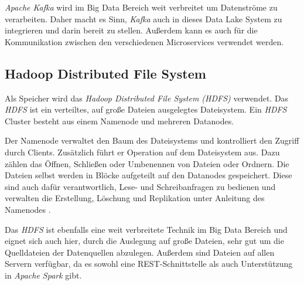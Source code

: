 \textit{Apache Kafka} wird im Big Data Bereich weit verbreitet um Datenströme zu verarbeiten.
Daher macht es Sinn, \textit{Kafka} auch in dieses Data Lake System zu integrieren und darin bereit zu stellen.
Außerdem kann es auch für die Kommunikation zwischen den verschiedenen Microservices verwendet werden.

\subsection{Hadoop Distributed File System}

Als Speicher wird das \textit{Hadoop Distributed File System (HDFS)} verwendet.
Das \textit{HDFS} ist ein verteiltes, auf große Dateien ausgelegtes Dateisystem.
Ein \textit{HDFS} Cluster besteht aus einem Namenode und mehreren Datanodes.

Der Namenode verwaltet den Baum des Dateisystems und kontrolliert den Zugriff durch Clients.
Zusätzlich führt er Operation auf dem Dateisystem aus.
Dazu zählen das Öffnen, Schließen oder Umbenennen von Dateien oder Ordnern.
Die Dateien selbst werden in Blöcke aufgeteilt auf den Datanodes gespeichert.
Diese sind auch dafür verantwortlich, Lese- und Schreibanfragen zu bedienen und verwalten die Erstellung, Löschung und Replikation unter Anleitung des Namenodes \parencite{hdfs}.

Das \textit{HDFS} ist ebenfalls eine weit verbreitete Technik im Big Data Bereich und eignet sich auch hier, durch die Auslegung auf große Dateien, sehr gut um die Quelldateien der Datenquellen abzulegen.
Außerdem sind Dateien auf allen Servern verfügbar, da es sowohl eine REST-Schnittstelle als auch Unterstützung in \textit{Apache Spark} gibt.

